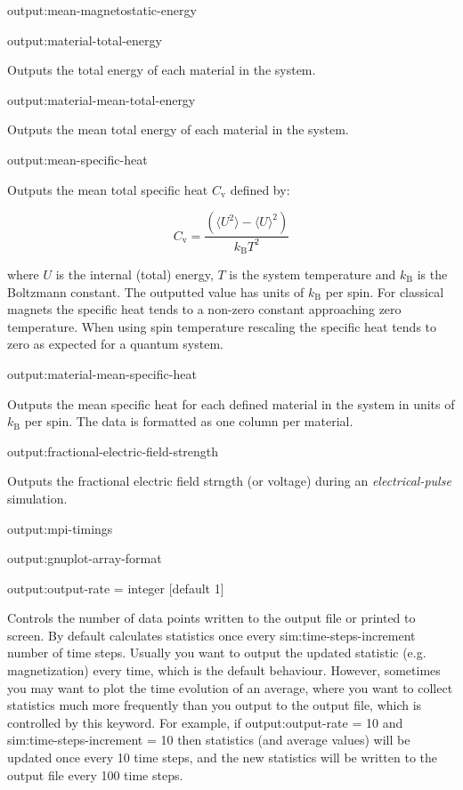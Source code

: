 {\zicf output:mean-magnetostatic-energy}

{\zicf output:material-total-energy} Outputs the total energy of each material in the system.

{\zicf output:material-mean-total-energy} Outputs the mean total energy of each material in the system.

{\zicf output:mean-specific-heat} Outputs the mean total specific heat $C_{\mathrm{v}}$ defined by:

\begin{equation*}
C_{\mathrm{v}} = \frac{\left(\langle U^2 \rangle - \langle U \rangle^2 \right)}{k_{\mathrm{B}} T^2}
\end{equation*}

\noindent where $U$ is the internal (total) energy, $T$ is the system temperature and $k_{\mathrm{B}}$ is the Boltzmann constant. The outputted value has units of $k_{\mathrm{B}}$ per spin. For classical magnets the specific heat tends to a non-zero constant approaching zero temperature. When using spin temperature rescaling the specific heat tends to zero as expected for a quantum system.

{\zicf output:material-mean-specific-heat} Outputs the mean specific heat for each defined material in the system in units of $k_{\mathrm{B}}$ per spin. The data is formatted as one column per material.

{\zicf output:fractional-electric-field-strength}
Outputs the fractional electric field strngth (or voltage) during an \textit{electrical-pulse} simulation.

{\zicf output:mpi-timings}

{\zicf output:gnuplot-array-format}

{\zicf output:output-rate = integer [default 1]} Controls the number of data points written to the output file or printed to screen. By default \vampire calculates statistics once every sim:time-steps-increment number of time steps. Usually you want to output the updated statistic (e.g. magnetization) every time, which is the default behaviour. However, sometimes you may want to plot the time evolution of an average, where you want to collect statistics much more frequently than you output to the output file, which is controlled by this keyword. For example, if output:output-rate = 10 and sim:time-steps-increment = 10 then statistics (and average values) will be updated once every 10 time steps, and the new statistics will be written to the output file every 100 time steps.

